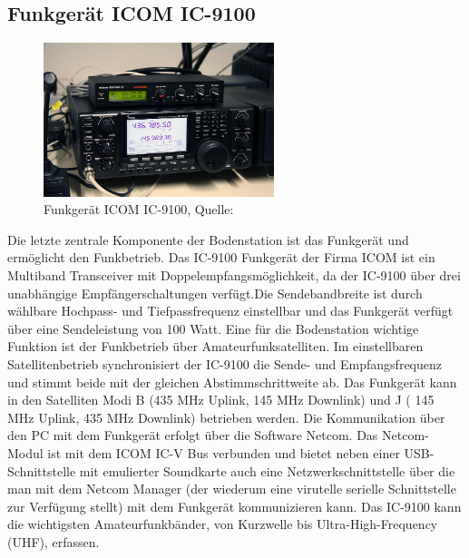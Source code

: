 \subsection{Funkgerät ICOM IC-9100}
\label{chap:funkgerät}
\begin{figure}[h]
	\centering
	\includegraphics[width=0.6\textwidth]{images/radio}
	\caption{Funkgerät ICOM IC-9100, Quelle: \cite{dk0te}}
	\label{fig:radio}
\end{figure}
Die letzte zentrale Komponente der Bodenstation ist das Funkgerät und ermöglicht den Funkbetrieb. Das IC-9100 Funkgerät der Firma ICOM ist ein 
Multiband Transceiver mit Doppelempfangsmöglichkeit, da der IC-9100 über drei unabhängige Empfängerschaltungen verfügt.Die Sendebandbreite ist durch 
wählbare Hochpass- und Tiefpassfrequenz einstellbar und das Funkgerät verfügt über eine Sendeleistung von 100 Watt. Eine für die Bodenstation 
wichtige Funktion ist der Funkbetrieb über Amateurfunksatelliten. Im einstellbaren Satellitenbetrieb synchronisiert der IC-9100 die Sende-  und 
Empfangsfrequenz und stimmt beide mit der gleichen Abstimmschrittweite ab. Das Funkgerät kann in den Satelliten Modi B (435 MHz Uplink, 145 MHz 
Downlink) und J ( 145 MHz Uplink, 435 MHz Downlink) betrieben werden. Die Kommunikation über den PC mit dem Funkgerät erfolgt über die Software 
Netcom.  Das Netcom-Modul ist mit dem ICOM IC-V Bus verbunden und bietet neben einer USB-Schnittstelle mit emulierter 
Soundkarte auch eine Netzwerkschnittstelle über die man mit dem Netcom Manager (der wiederum eine virutelle serielle Schnittstelle zur Verfügung 
stellt) mit dem Funkgerät kommunizieren kann. Das IC-9100 kann die wichtigsten Amateurfunkbänder, von Kurzwelle bis Ultra-High-Frequency (UHF), 
erfassen. 





